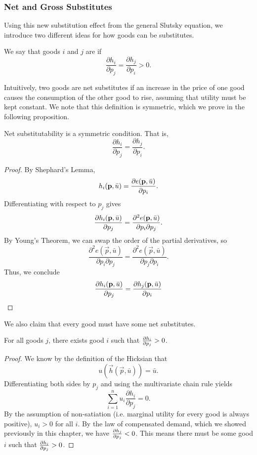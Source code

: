 \subsubsection*{Net and Gross Substitutes}
Using this new substitution effect from the general Slutsky equation, we introduce two different ideas for how goods can be substitutes.

\begin{definition*}
We say that goods $i$ and $j$ are  if 
$$
\frac{\partial h_{i}}{\partial p_{j}}=\frac{\partial h_{j}}{\partial p_{i}}>0.
$$
\end{definition*}
Intuitively, two goods are net substitutes if an increase in the price of one good causes the consumption of the other good to rise, assuming that utility must be kept constant. We note that this definition is symmetric, which we prove in the following proposition.

\begin{proposition*}
Net substitutability is a symmetric condition. That is, $$\frac{\partial h_{i}}{\partial p_{j}}=\frac{\partial h_{j}}{\partial p_{i}}.$$ 
\end{proposition*}

\begin{proof}
By Shephard's Lemma, 
$$h_i(\mathbf{p}, \bar{u}) = \pdv{e(\mathbf{p}, \bar{u})}{p_i}.$$
Differentiating with respect to $p_j$ gives
$$\pdv{h_i(\mathbf{p}, \bar{u})}{p_j} = \frac{\partial^2 e(\mathbf{p}, \bar{u})}{\partial p_i \partial p_j}.$$
By Young's Theorem, we can swap the order of the partial derivatives, so 
$$\frac{\partial^2 e(\vec{p}, \bar{u})}{\partial p_i \partial p_j} = \frac{\partial^2 e(\vec{p}, \bar{u})}{\partial p_j \partial p_i}.$$
Thus, we conclude 
$$\pdv{h_i(\mathbf{p}, \bar{u})}{p_j} = \pdv{h_j(\mathbf{p}, \bar{u})}{p_i}$$
\end{proof}
We also claim that every good must have some net substitutes.
\begin{proposition*}
For all goods $j$, there exists good $i$ such that $\pdv{h_i}{p_j} > 0$.
\end{proposition*}
\begin{proof}
We know by the definition of the Hicksian that
$$u(\vec{h}(\vec{p}, \bar{u})) = \bar{u}.$$
Differentiating both sides by $p_j$ and using the multivariate chain rule yields 
$$
\sum_{i=1}^{n} u_{i} \frac{\partial h_{i}}{\partial p_{j}}=0.
$$
By the assumption of non-satiation (i.e. marginal utility for every good is always positive), $u_i > 0$ for all $i$. By the law of compensated demand, which we showed previously in this chapter, we have $\pdv{h_j}{p_j} < 0$. This means there must be some good $i$ such that $\pdv{h_i}{p_j} > 0$.
\end{proof}


